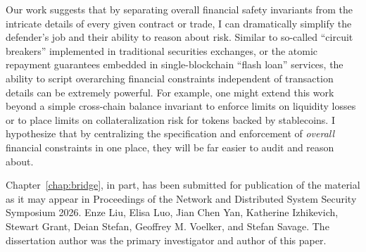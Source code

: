Our work suggests that by separating overall financial safety
invariants from the intricate details of every given contract or
trade, I can dramatically simplify the defender's job and their
ability to reason about risk.  Similar to so-called ``circuit
breakers'' implemented in traditional securities exchanges, or the
atomic repayment guarantees embedded in single-blockchain ``flash
loan'' services, the ability to script overarching financial
constraints independent of transaction details can be extremely
powerful.  For example, one might extend this work beyond a simple
cross-chain balance invariant to enforce limits on liquidity losses or
to place limits on collateralization risk for tokens backed by
stablecoins.  I hypothesize that by centralizing the specification and
enforcement of \emph{overall} financial constraints in one place, they
will be far easier to audit and reason about.


Chapter~\ref{chap:bridge}, in part, has been submitted for publication of the material as it may appear in Proceedings of the Network and Distributed System Security Symposium 2026. Enze Liu, Elisa Luo, Jian Chen Yan, Katherine Izhikevich, Stewart Grant, Deian Stefan, Geoffrey M. Voelker, and Stefan Savage. The dissertation author was the primary investigator and author of this paper.


